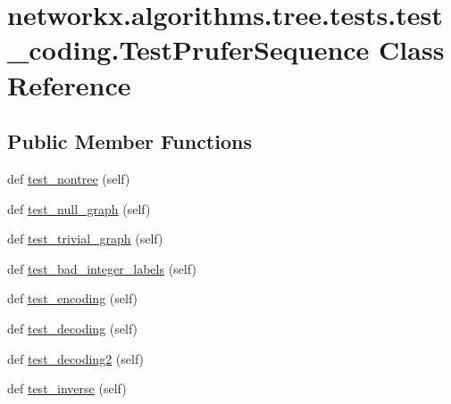 \hypertarget{classnetworkx_1_1algorithms_1_1tree_1_1tests_1_1test__coding_1_1TestPruferSequence}{}\section{networkx.\+algorithms.\+tree.\+tests.\+test\+\_\+coding.\+Test\+Prufer\+Sequence Class Reference}
\label{classnetworkx_1_1algorithms_1_1tree_1_1tests_1_1test__coding_1_1TestPruferSequence}
\subsection*{Public Member Functions}
\begin{DoxyCompactItemize}
\item 
def \hyperlink{classnetworkx_1_1algorithms_1_1tree_1_1tests_1_1test__coding_1_1TestPruferSequence_a0221993e7c7dfaf159d8c6e9f0d87379}{test\+\_\+nontree} (self)
\item 
def \hyperlink{classnetworkx_1_1algorithms_1_1tree_1_1tests_1_1test__coding_1_1TestPruferSequence_a78cdb62769c255a8618ea3465d5064f2}{test\+\_\+null\+\_\+graph} (self)
\item 
def \hyperlink{classnetworkx_1_1algorithms_1_1tree_1_1tests_1_1test__coding_1_1TestPruferSequence_ae6db56802ecb8d18af9e18ac9ffb0197}{test\+\_\+trivial\+\_\+graph} (self)
\item 
def \hyperlink{classnetworkx_1_1algorithms_1_1tree_1_1tests_1_1test__coding_1_1TestPruferSequence_a042112478aca0169dd08d2e448f47d09}{test\+\_\+bad\+\_\+integer\+\_\+labels} (self)
\item 
def \hyperlink{classnetworkx_1_1algorithms_1_1tree_1_1tests_1_1test__coding_1_1TestPruferSequence_a37dea0c6c223b21dc401299603845586}{test\+\_\+encoding} (self)
\item 
def \hyperlink{classnetworkx_1_1algorithms_1_1tree_1_1tests_1_1test__coding_1_1TestPruferSequence_a48f7d29f5c27aaa8078873303e2626d0}{test\+\_\+decoding} (self)
\item 
def \hyperlink{classnetworkx_1_1algorithms_1_1tree_1_1tests_1_1test__coding_1_1TestPruferSequence_ae02b0c6b2cd88ce19552d01a131a0c4c}{test\+\_\+decoding2} (self)
\item 
def \hyperlink{classnetworkx_1_1algorithms_1_1tree_1_1tests_1_1test__coding_1_1TestPruferSequence_ade8b6bd2e8da3c3782ce08eaac03fe01}{test\+\_\+inverse} (self)
\end{DoxyCompactItemize}


